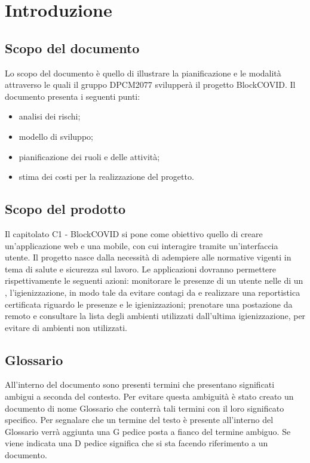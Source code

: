 \section{Introduzione}

\subsection{Scopo del documento}
Lo scopo del documento è quello di illustrare la pianificazione e le modalità attraverso le quali il gruppo DPCM2077 svilupperà il progetto BlockCOVID.
Il documento presenta i seguenti punti:
\begin{itemize}
	\item analisi dei rischi;
	\item modello di sviluppo;
	\item pianificazione dei ruoli e delle attività;
	\item stima dei costi per la realizzazione del progetto.
\end{itemize}

\subsection{Scopo del prodotto}
Il capitolato C1 - BlockCOVID si pone come obiettivo quello di creare un'applicazione web e una mobile,
con cui interagire tramite un’interfaccia utente.
Il progetto nasce dalla necessità di adempiere alle normative vigenti in tema di salute e sicurezza sul lavoro.
Le applicazioni dovranno permettere rispettivamente le seguenti azioni: monitorare le presenze di un utente nelle  di un ,
 l'igienizzazione, in modo tale da evitare contagi da  e realizzare una reportistica certificata riguardo 
le presenze e le igienizzazioni; prenotare una postazione da remoto e consultare la lista degli ambienti utilizzati 
dall'ultima igienizzazione, per evitare di  ambienti non utilizzati.

\subsection{Glossario}
All'interno del  documento sono presenti termini che presentano significati ambigui a seconda del contesto.
Per evitare questa ambiguità è stato creato un  documento di nome Glossario che  conterrà tali termini con il loro significato specifico. Per segnalare che un termine del testo è presente all'interno del Glossario  
verrà aggiunta una G pedice posta a fianco del termine ambiguo. 
Se viene indicata una D pedice significa che si sta facendo riferimento a un documento.


